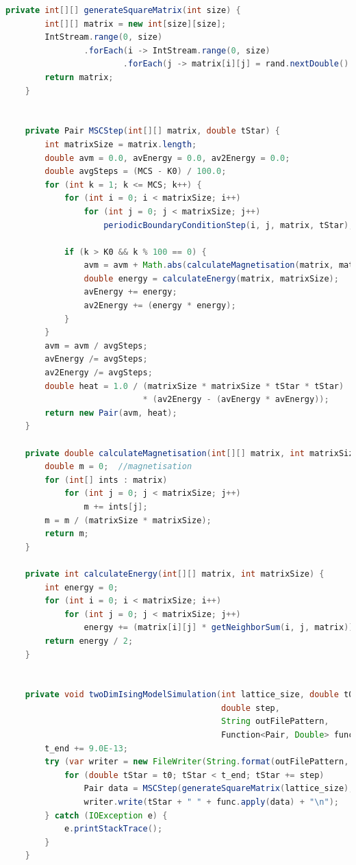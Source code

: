 \documentclass[11pt]{article}
\begin{document}
\begin{small}
\begin{lstlisting}[language=Java, frame=lines, numberstyle=\tiny, stepnumber=5,
            caption=Java Simulation Code \label{hibernate-properties}., firstnumber=1,label={lst:code}]
    private int[][] generateSquareMatrix(int size) {
        int[][] matrix = new int[size][size];
        IntStream.range(0, size)
                .forEach(i -> IntStream.range(0, size)
                        .forEach(j -> matrix[i][j] = rand.nextDouble() > 0.5 ? 1 : -1));
        return matrix;
    }


    private Pair MSCStep(int[][] matrix, double tStar) {
        int matrixSize = matrix.length;
        double avm = 0.0, avEnergy = 0.0, av2Energy = 0.0;
        double avgSteps = (MCS - K0) / 100.0;
        for (int k = 1; k <= MCS; k++) {
            for (int i = 0; i < matrixSize; i++)
                for (int j = 0; j < matrixSize; j++)
                    periodicBoundaryConditionStep(i, j, matrix, tStar);

            if (k > K0 && k % 100 == 0) {
                avm = avm + Math.abs(calculateMagnetisation(matrix, matrixSize));
                double energy = calculateEnergy(matrix, matrixSize);
                avEnergy += energy;
                av2Energy += (energy * energy);
            }
        }
        avm = avm / avgSteps;
        avEnergy /= avgSteps;
        av2Energy /= avgSteps;
        double heat = 1.0 / (matrixSize * matrixSize * tStar * tStar)
                            * (av2Energy - (avEnergy * avEnergy));
        return new Pair(avm, heat);
    }

    private double calculateMagnetisation(int[][] matrix, int matrixSize) {
        double m = 0;  //magnetisation
        for (int[] ints : matrix)
            for (int j = 0; j < matrixSize; j++)
                m += ints[j];
        m = m / (matrixSize * matrixSize);
        return m;
    }

    private int calculateEnergy(int[][] matrix, int matrixSize) {
        int energy = 0;
        for (int i = 0; i < matrixSize; i++)
            for (int j = 0; j < matrixSize; j++)
                energy += (matrix[i][j] * getNeighborSum(i, j, matrix));
        return energy / 2;
    }


    private void twoDimIsingModelSimulation(int lattice_size, double t0, double t_end,
                                            double step,
                                            String outFilePattern,
                                            Function<Pair, Double> func) {
        t_end += 9.0E-13;
        try (var writer = new FileWriter(String.format(outFilePattern, lattice_size))) {
            for (double tStar = t0; tStar < t_end; tStar += step)
                Pair data = MSCStep(generateSquareMatrix(lattice_size), tStar);
                writer.write(tStar + " " + func.apply(data) + "\n");
        } catch (IOException e) {
            e.printStackTrace();
        }
    }


\end{lstlisting}
\end{small}
\end{document}
